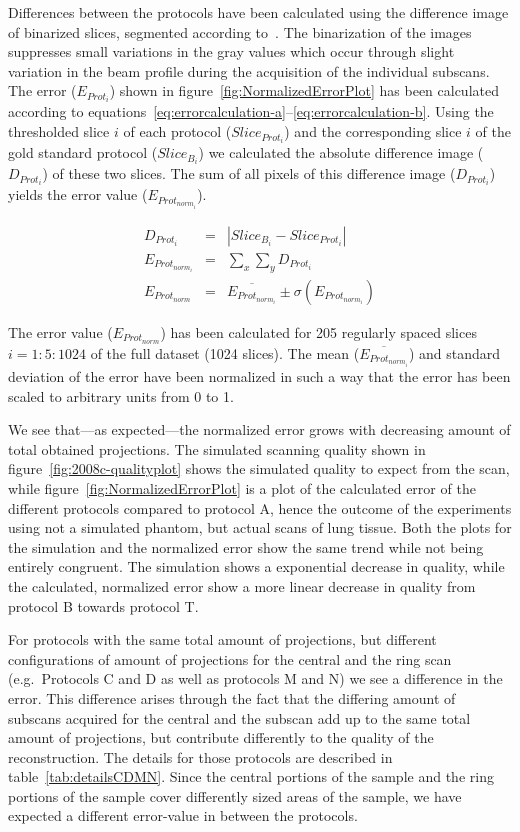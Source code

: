 Differences between the protocols have been calculated using the difference image of binarized slices, segmented according to~\citet{Otsu1979}. The binarization of the images suppresses small variations in the gray values which occur through slight variation in the beam profile during the acquisition of the individual subscans. The error ($E_{Prot_{i}}$) shown in figure~\ref{fig:NormalizedErrorPlot} has been calculated according to equations~\ref{eq:errorcalculation-a}--\ref{eq:errorcalculation-b}. Using the thresholded slice $i$ of each protocol ($Slice_{Prot_{i}}$) and the corresponding slice $i$ of the gold standard protocol ($Slice_{B_{i}}$) we calculated the absolute difference image ($D_{Prot_{i}}$) of these two slices. The sum of all pixels of this difference image ($D_{Prot_{i}}$) yields the error value ($E_{Prot_{norm_{i}}}$).

\begin{eqnarray}
       D_{Prot_{i}} &=& |Slice_{B_{i}}-Slice_{Prot_{i}}|\label{eq:errorcalculation-a}\\
E_{Prot_{norm_{i}}} &=& \sum_{x}\sum_{y} D_{Prot_{i}}\label{eq:errorcalculation-b}\\
    E_{Prot_{norm}} &=& \overline{E_{Prot_{norm_{i}}}} \pm \sigma(E_{Prot_{norm_{i}}})\label{eq:errorcalculation-c}
\end{eqnarray}

The error value ($E_{Prot_{norm}}$) has been calculated for 205 regularly spaced slices $i=1:5:1024$ of the full dataset (1024 slices). The mean ($\overline{E_{Prot_{norm_{i}}}}$) and standard deviation of the error have been normalized in such a way that the error has been scaled to arbitrary units from 0 to 1.

We see that---as expected---the normalized error grows with decreasing amount of total obtained projections. The simulated scanning quality shown in figure~\ref{fig:2008c-qualityplot} shows the simulated quality to expect from the scan, while figure~\ref{fig:NormalizedErrorPlot} is a plot of the calculated error of the different protocols compared to protocol A, hence the outcome of the experiments using not a simulated phantom, but actual scans of lung tissue. Both the plots for the simulation and the normalized error show the same trend while not being entirely congruent. The simulation shows a exponential decrease in quality, while the calculated, normalized error show a more linear decrease in quality from protocol B towards protocol T.

For protocols with the same total amount of projections, but different configurations of amount of projections for the central and the ring scan (e.g.\ Protocols C and D as well as protocols M and N) we see a difference in the error. This difference arises through the fact that the differing amount of subscans acquired for the central and the subscan add up to the same total amount of projections, but contribute differently to the quality of the reconstruction. The details for those protocols are described in table~\ref{tab:detailsCDMN}. Since the central portions of the sample and the ring portions of the sample cover differently sized areas of the sample, we have expected a different error-value in between the protocols. 


